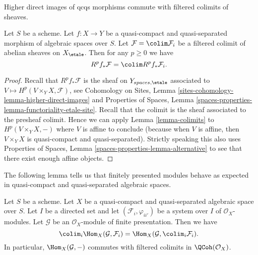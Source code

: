 \begin{lemma}
\label{lemma-colimit-cohomology}
\begin{slogan}
Higher direct images of qcqs morphisms commute with filtered colimits
of sheaves.
\end{slogan}
Let $S$ be a scheme. Let $f : X \to Y$ be a quasi-compact and quasi-separated
morphism of algebraic spaces over $S$. Let $\mathcal{F} = \colim \mathcal{F}_i$
be a filtered colimit of abelian sheaves on $X_\etale$.
Then for any $p \geq 0$ we have
$$
R^pf_*\mathcal{F} = \colim R^pf_*\mathcal{F}_i.
$$
\end{lemma}

\begin{proof}
Recall that $R^pf_*\mathcal{F}$ is the sheaf on $Y_{spaces, \etale}$
associated to $V \mapsto H^p(V \times_Y X, \mathcal{F})$, see
Cohomology on Sites, Lemma \ref{sites-cohomology-lemma-higher-direct-images}
and Properties of Spaces, Lemma
\ref{spaces-properties-lemma-functoriality-etale-site}.
Recall that the colimit is the sheaf associated to the presheaf colimit.
Hence we can apply Lemma \ref{lemma-colimits}
to $H^p(V \times_Y X, -)$ where $V$ is affine to conclude (because
when $V$ is affine, then $V \times_Y X$ is quasi-compact and quasi-separated).
Strictly speaking this also uses Properties of Spaces,
Lemma \ref{spaces-properties-lemma-alternative} to see that there exist
enough affine objects.
\end{proof}

\noindent
The following lemma tells us that finitely presented modules behave
as expected in quasi-compact and quasi-separated algebraic spaces.

\begin{lemma}
\label{lemma-finite-presentation-quasi-compact-colimit}
Let $S$ be a scheme. Let $X$ be a quasi-compact and quasi-separated
algebraic space over $S$. Let $I$ be a directed set and
let $(\mathcal{F}_i, \varphi_{ii'})$ be a system over $I$
of $\mathcal{O}_X$-modules. Let $\mathcal{G}$ be an
$\mathcal{O}_X$-module of finite presentation. Then we have
$$
\colim_i \Hom_X(\mathcal{G}, \mathcal{F}_i)
=
\Hom_X(\mathcal{G}, \colim_i \mathcal{F}_i).
$$
In particular, $\Hom_X(\mathcal{G}, -)$ commutes with filtered
colimits in $\QCoh(\mathcal{O}_X)$.
\end{lemma}

